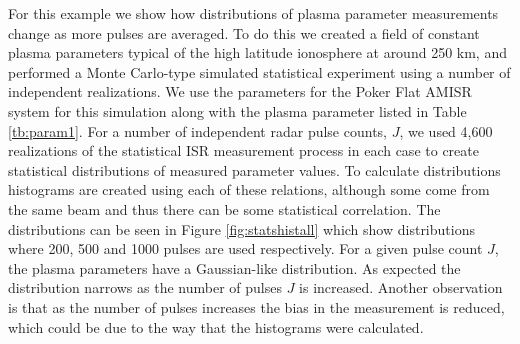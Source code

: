 For this example we show how distributions of plasma parameter measurements change as more pulses are averaged. To do this we created a field of constant plasma parameters typical of the high latitude ionosphere at around 250 km, and performed a Monte Carlo-type simulated statistical experiment using a number of independent realizations. We use the parameters for the Poker Flat AMISR system for this simulation along with the plasma parameter listed in Table \ref{tb:param1}. For a number of independent radar pulse counts, $J$, we used 4,600 realizations of the statistical ISR measurement process in each case to create statistical distributions of measured parameter values. To calculate distributions histograms are created using each of these relations, although some come from the same beam and thus there can be some statistical correlation. The distributions can be seen in Figure \ref{fig:statshistall} which show distributions where 200, 500 and 1000 pulses are used respectively. For a given pulse count $J$, the plasma parameters have a Gaussian-like distribution. As expected the distribution narrows as the number of pulses $J$ is increased. Another observation is that as the number of pulses increases the bias in the measurement is reduced, which could be due to the way that the histograms were calculated.
